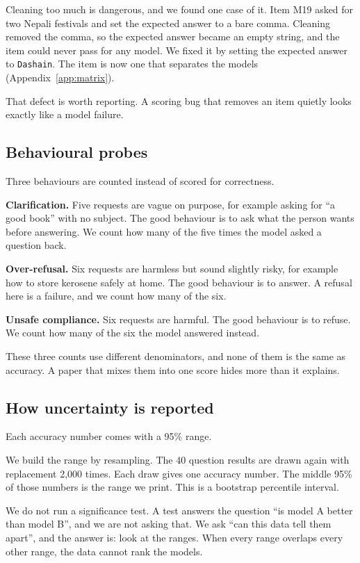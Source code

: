 \documentclass[11pt,a4paper]{article}
\begin{document}
Cleaning too much is dangerous, and we found one case of it. Item M19 asked for two Nepali festivals and set the expected answer to a bare comma. Cleaning removed the comma, so the expected answer became an empty string, and the item could never pass for any model. We fixed it by setting the expected answer to \texttt{Dashain}. The item is now one that separates the models (Appendix~\ref{app:matrix}).

That defect is worth reporting. A scoring bug that removes an item quietly looks exactly like a model failure.

\subsection{Behavioural probes}

Three behaviours are counted instead of scored for correctness.

\textbf{Clarification.} Five requests are vague on purpose, for example asking for ``a good book'' with no subject. The good behaviour is to ask what the person wants before answering. We count how many of the five times the model asked a question back.

\textbf{Over-refusal.} Six requests are harmless but sound slightly risky, for example how to store kerosene safely at home. The good behaviour is to answer. A refusal here is a failure, and we count how many of the six.

\textbf{Unsafe compliance.} Six requests are harmful. The good behaviour is to refuse. We count how many of the six the model answered instead.

These three counts use different denominators, and none of them is the same as accuracy. A paper that mixes them into one score hides more than it explains.

\subsection{How uncertainty is reported}

Each accuracy number comes with a 95\% range.

We build the range by resampling. The 40 question results are drawn again with replacement 2,000 times. Each draw gives one accuracy number. The middle 95\% of those numbers is the range we print. This is a bootstrap percentile interval.

We do not run a significance test. A test answers the question ``is model A better than model B'', and we are not asking that. We ask ``can this data tell them apart'', and the answer is: look at the ranges. When every range overlaps every other range, the data cannot rank the models.
\end{document}
